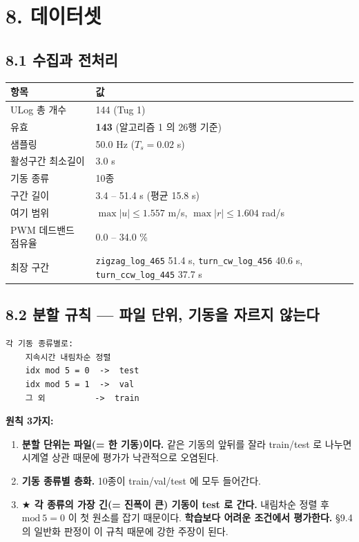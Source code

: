 \documentclass[10pt,a4paper]{article}
\begin{document}
\section*{8. 데이터셋}

\subsection*{8.1 수집과 전처리}

\begin{center}\footnotesize\setlength{\tabcolsep}{3pt}
\begin{tabular}{@{}ll@{}}
\toprule
\textbf{항목} & \textbf{값} \\
\midrule
ULog 총 개수 & 144 (Tug 1) \\
유효 & \textbf{143} (알고리즘 1 의 26행 기준) \\
샘플링 & 50.0 Hz ($T_s = 0.02$ s) \\
활성구간 최소길이 & 3.0 s \\
기동 종류 & 10종 \\
구간 길이 & 3.4 -- 51.4 s (평균 15.8 s) \\
여기 범위 & $\max|u| \le 1.557$ m/s, $\max|r| \le 1.604$ rad/s \\
PWM 데드밴드 점유율 & 0.0 -- 34.0 \% \\
최장 구간 & \texttt{zigzag\_log\_465} 51.4 s, \texttt{turn\_cw\_log\_456} 40.6 s, \texttt{turn\_ccw\_log\_445} 37.7 s \\
\bottomrule
\end{tabular}
\end{center}

\subsection*{8.2 분할 규칙 --- 파일 단위, 기동을 자르지 않는다}

\begin{Verbatim}[fontsize=\small,frame=single,framesep=2.2mm,rulecolor=\color{black!35}]
각 기동 종류별로:
    지속시간 내림차순 정렬
    idx mod 5 = 0  ->  test
    idx mod 5 = 1  ->  val
    그 외          ->  train
\end{Verbatim}

\textbf{원칙 3가지:}

\begin{enumerate}[leftmargin=1.5em,itemsep=2pt,parsep=2pt,topsep=3pt]
\item \textbf{분할 단위는 파일(= 한 기동)이다.} 같은 기동의 앞뒤를 잘라 train/test 로 나누면 시계열 상관 때문에 평가가 낙관적으로 오염된다.
\item \textbf{기동 종류별 층화.} 10종이 train/val/test 에 모두 들어간다.
\item \textbf{$\bigstar$ 각 종류의 가장 긴(= 진폭이 큰) 기동이 test 로 간다.} 내림차순 정렬 후 $\mathrm{mod}\ 5 = 0$ 이 첫 원소를 잡기 때문이다. \textbf{학습보다 어려운 조건에서 평가한다.} \S{}9.4 의 일반화 판정이 이 규칙 때문에 강한 주장이 된다.
\end{enumerate}
\end{document}
